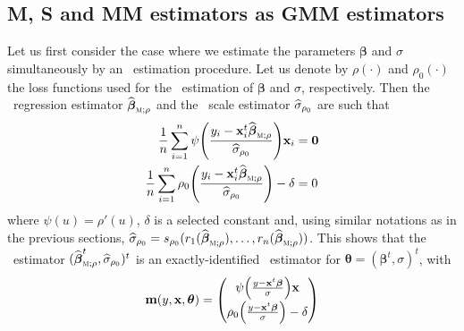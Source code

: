 \subsection{M, S and MM estimators as GMM estimators}

Let us first consider the case where we estimate the parameters
$\boldsymbol\beta$ and $\sigma$ simultaneously by an ~estimation
procedure. Let us denote by $\rho(\cdot)$ and $\rho_0(\cdot)$ the loss
functions used for the ~estimation of $\boldsymbol\beta$ and $\sigma$,
respectively. Then the ~regression estimator
$\sthat{\boldsymbol\beta}_{\stsc{M};\rho}$ and the ~scale estimator
$\widehat{\sigma}_{\rho_0}$ are such that
%
\begin{equation}
    \label{Eq:GMM_equations_M}
    \begin{aligned}
        \frac{1}{n} \sum_{i=1}^{n} 
            \psi\left(\frac{y_i-\stvec{x}_i^t\sthat{\boldsymbol\beta}_{\stsc{M};\rho}}
            {\sthat{\sigma}_{\rho_0}}\right) \stvec{x}_i 
        & = \stvec{0}
        \\
        \frac{1}{n}\sum_{i=1}^{n}
            \rho_0\left(\frac{y_i-\stvec{x}_i^t\sthat{\boldsymbol\beta}_{\stsc{M};\rho}}
            {\sthat{\sigma}_{\rho_0}}\right) - \delta
        & = 0
    \end{aligned}
\end{equation}
%
where $\psi(u) = \rho'(u)$, $\delta$ is a selected constant and, using similar
notations as in the previous sections, $\sthat{\sigma}_{\rho_0} =
s_{\rho_0}(r_1(\sthat{\boldsymbol\beta}_{\stsc{M};\rho}), \dots,
r_n(\sthat{\boldsymbol\beta}_{\stsc{M};\rho}))$. This shows that the 
~estimator $(\sthat{\boldsymbol\beta}_{\stsc{M};\rho}^t,
\sthat{\sigma}_{\rho_0})^t$ is an exactly-identified ~estimator for
$\boldsymbol\theta = (\boldsymbol\beta^t, \sigma)^t$, with
%
\begin{equation}
    \label{Eq:GMM_moment_function_M}
    \stvec{m}(y, \stvec{x}, \boldsymbol\theta) =
    \begin{pmatrix}
        \psi\left(\frac{y-\stvec{x}^t\boldsymbol\beta}{\sigma}\right) \stvec{x}
        \\[1ex]
        \rho_0\left(\frac{y-\stvec{x}^t\boldsymbol\beta}{\sigma}\right) - \delta
    \end{pmatrix}
\end{equation}

